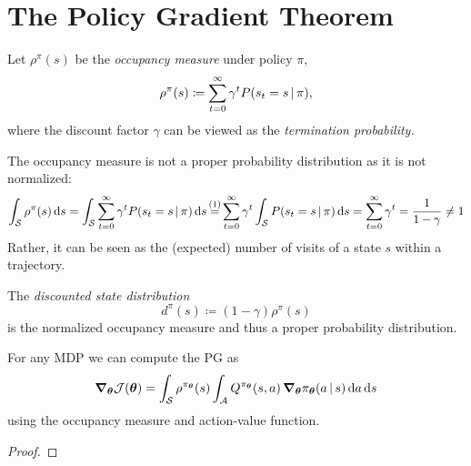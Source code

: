 	\section{The Policy Gradient Theorem}
		\begin{definition}
			Let \( \rho^\pi(s) \) be the \emph{occupancy measure} under policy \(\pi\),
			\begin{equation}
				\rho^\pi(s) \coloneqq \sum_{t = 0}^{\infty} \gamma^t P(s_t = s \,\vert\, \pi),
			\end{equation}
			where the discount factor \(\gamma\) can be viewed as the \emph{termination probability.}
		\end{definition}
		\begin{remark}
			The occupancy measure is not a proper probability distribution as it is not normalized:
			\begin{equation}
				\int_\mathcal{S} \rho^\pi(s) \dd{s}
					= \int_\mathcal{S} \sum_{t = 0}^{\infty} \gamma^t P(s_t = s \given \pi) \dd{s}
					\oversetfootnotemark{=} \sum_{t = 0}^{\infty} \gamma^t \int_\mathcal{S} P(s_t = s \given \pi) \dd{s}
					= \sum_{t = 0}^{\infty} \gamma^t
					= \frac{1}{1 - \gamma}
					\neq 1
			\end{equation}
			Rather, it can be seen as the (expected) number of visits of a state \(s\) within a trajectory.
		\end{remark}
		\begin{definition}
			The \emph{discounted state distribution}
			\begin{equation}
				d^\pi(s) \coloneqq (1 - \gamma) \rho^\pi(s)
			\end{equation}
			is the normalized occupancy measure and thus a proper probability distribution.
		\end{definition}
		\begin{theorem}
			For any \ac{MDP} we can compute the \ac{PG} as
			\begin{equation}
				\grad_{\bm{\theta}} \mathcal{J}(\bm{\theta}) = \int_\mathcal{S} \rho^{\pi_{\bm{\theta}}}(s) \int_\mathcal{A} Q^{\pi_{\bm{\theta}}}(s, a) \, \grad_{\bm{\theta}} \pi_{\bm{\theta}}(a \,\vert\, s) \dd{a} \dd{s}
			\end{equation}
			using the occupancy measure and action-value function.
		\end{theorem}
		\begin{proof}
		\end{proof}
